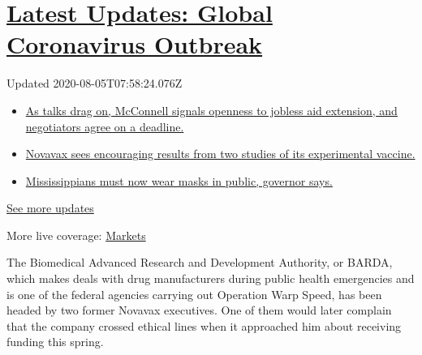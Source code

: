 \hypertarget{latest-updates-global-coronavirus-outbreak}{%
\section{\texorpdfstring{\href{https://www.nytimes.com/2020/08/04/world/coronavirus-cases.html?action=click\&pgtype=Article\&state=default\&region=MAIN_CONTENT_1\&context=storylines_live_updates}{Latest
Updates: Global Coronavirus
Outbreak}}{Latest Updates: Global Coronavirus Outbreak}}\label{latest-updates-global-coronavirus-outbreak}}

Updated 2020-08-05T07:58:24.076Z

\begin{itemize}
\tightlist
\item
  \href{https://www.nytimes.com/2020/08/04/world/coronavirus-cases.html?action=click\&pgtype=Article\&state=default\&region=MAIN_CONTENT_1\&context=storylines_live_updates\#link-762df92}{As
  talks drag on, McConnell signals openness to jobless aid extension,
  and negotiators agree on a deadline.}
\item
  \href{https://www.nytimes.com/2020/08/04/world/coronavirus-cases.html?action=click\&pgtype=Article\&state=default\&region=MAIN_CONTENT_1\&context=storylines_live_updates\#link-1228a480}{Novavax
  sees encouraging results from two studies of its experimental
  vaccine.}
\item
  \href{https://www.nytimes.com/2020/08/04/world/coronavirus-cases.html?action=click\&pgtype=Article\&state=default\&region=MAIN_CONTENT_1\&context=storylines_live_updates\#link-794484ed}{Mississippians
  must now wear masks in public, governor says.}
\end{itemize}

\href{https://www.nytimes.com/2020/08/04/world/coronavirus-cases.html?action=click\&pgtype=Article\&state=default\&region=MAIN_CONTENT_1\&context=storylines_live_updates}{See
more updates}

More live coverage:
\href{https://www.nytimes.com/live/2020/08/04/business/stock-market-today-coronavirus?action=click\&pgtype=Article\&state=default\&region=MAIN_CONTENT_1\&context=storylines_live_updates}{Markets}

The Biomedical Advanced Research and Development Authority, or BARDA,
which makes deals with drug manufacturers during public health
emergencies and is one of the federal agencies carrying out Operation
Warp Speed, has been headed by two former Novavax executives. One of
them would later complain that the company crossed ethical lines when it
approached him about receiving funding this spring.

